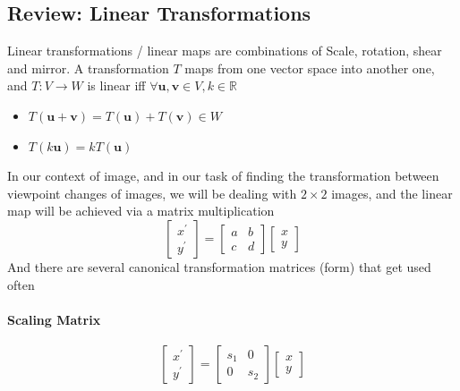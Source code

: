 \documentclass[11pt]{article}
\newcommand{\bu}{\mathbf{u}}
\newcommand{\bv}{\mathbf{v}}
\newcommand{\real}{\mathbb{R}}
\begin{document}
\subsection{Review: Linear Transformations}
Linear transformations / linear maps are combinations of Scale, rotation, shear and mirror. A transformation $T$ maps from one vector space into another one, and $T: V\rightarrow W$ is linear iff $\forall \bu, \bv \in V, k \in \real$
\begin{itemize}
	\item $T(\bu + \bv) = T(\bu) + T(\bv) \in W$
	\item $T(k\bu) = kT(\bu)$
\end{itemize}
In our context of image, and in our task of finding the transformation between viewpoint changes of images, we will be dealing with $2\times 2$ images, and the linear map will be achieved via a matrix multiplication 
\begin{equation}
	\left[\begin{array}{l}
		x^{\prime} \\
		y^{\prime}
		\end{array}\right]=\left[\begin{array}{ll}
		a & b \\
		c & d
		\end{array}\right]\left[\begin{array}{l}
		x \\
		y
	\end{array}\right]
\end{equation}
And there are several canonical transformation matrices (form) that get used often
\paragraph{Scaling Matrix}
\begin{equation}
	\left[\begin{array}{l}
		x^{\prime} \\
		y^{\prime}
		\end{array}\right]=\left[\begin{array}{ll}
		s_1 & 0 \\
		0 & s_2
		\end{array}\right]\left[\begin{array}{l}
		x \\
		y
	\end{array}\right]
\end{equation}
\end{document}
